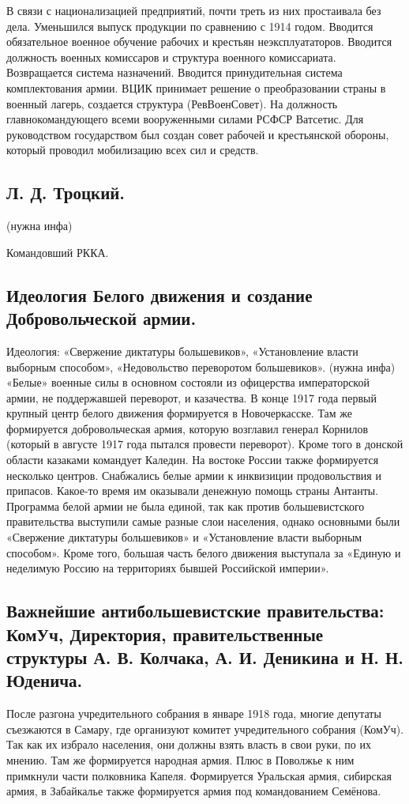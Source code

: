 В связи с национализацией предприятий, почти треть из них простаивала без дела. Уменьшился выпуск продукции по сравнению с 1914 годом.
Вводится обязательное военное обучение рабочих и крестьян неэксплуататоров. Вводится должность военных комиссаров и структура военного комиссариата. Возвращается система назначений. Вводится принудительная система комплектования армии.
ВЦИК принимает решение о преобразовании страны в военный лагерь, создается структура (РевВоенСовет). На должность главнокомандующего всеми вооруженными силами РСФСР Ватсетис. Для руководством государством был создан совет рабочей и крестьянской обороны, который проводил мобилизацию всех сил и средств.

\subsection{Л. Д. Троцкий.} (нужна инфа)

Командовший РККА.

\subsection{Идеология Белого движения и создание Добровольческой армии.}

Идеология: «Свержение диктатуры большевиков», «Установление власти выборным способом», «Недовольство переворотом большевиков». (нужна инфа)
«Белые» военные силы в основном состояли из офицерства императорской армии, не поддержавшей переворот, и казачества. В конце 1917 года первый крупный центр белого движения формируется в Новочеркасске. Там же формируется добровольческая армия, которую возглавил генерал Корнилов (который в августе 1917 года пытался провести переворот). Кроме того в донской области казаками командует Каледин. На востоке России также формируется несколько центров.
Снабжались белые армии к инквизиции продовольствия и припасов. Какое-то время им оказывали денежную помощь страны Антанты.
Программа белой армии не была единой, так как против большевистского правительства выступили самые разные слои населения, однако основными были «Свержение диктатуры большевиков» и «Установление власти выборным способом». Кроме того, большая часть белого движения выступала за «Единую и неделимую Россию на территориях бывшей Российской	 империи».

\subsection{Важнейшие антибольшевистские правительства: КомУч, Директория, правительственные структуры А. В. Колчака, А. И. Деникина и Н. Н. Юденича.}
После разгона учредительного собрания в январе 1918 года, многие депутаты съезжаются в Самару, где организуют комитет учредительного собрания (КомУч). Так как их избрало населения, они должны взять власть в свои руки, по их мнению. Там же формируется народная армия. Плюс в Поволжье к ним примкнули части полковника Капеля. Формируется Уральская армия, сибирская армия, в Забайкалье также формируется армия под командованием Семёнова. 

